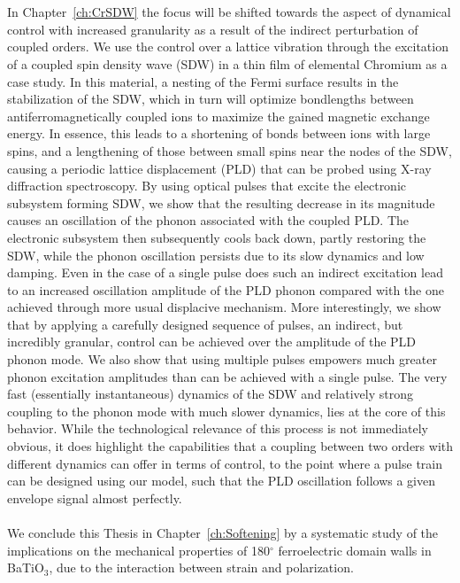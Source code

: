 \\\\
In Chapter~\ref{ch:CrSDW} the focus will be shifted towards the aspect of dynamical control with increased granularity as a result of the indirect perturbation of coupled orders.
We use the control over a lattice vibration through the excitation of a coupled spin density wave (SDW) in a thin film of elemental Chromium as a case study.
In this material, a nesting of the Fermi surface results in the stabilization of the SDW, which in turn will optimize bondlengths between antiferromagnetically coupled ions to maximize the gained magnetic exchange energy.
In essence, this leads to a shortening of bonds between ions with large spins, and a lengthening of those between small spins near the nodes of the SDW, causing a periodic lattice displacement (PLD) that can be probed using X-ray diffraction spectroscopy.
By using optical pulses that excite the electronic subsystem forming SDW, we show that the resulting  decrease in its magnitude causes an oscillation of the phonon associated with the coupled PLD.
The electronic subsystem then subsequently cools back down, partly restoring the SDW, while the phonon oscillation persists due to its slow dynamics and low damping.
Even in the case of a single pulse does such an indirect excitation lead to an increased oscillation amplitude of the PLD phonon compared with the one achieved through more usual displacive mechanism.
More interestingly, we show that by applying a carefully designed sequence of pulses, an indirect, but incredibly granular, control can be achieved over the amplitude of the PLD phonon mode.
We also show that using multiple pulses empowers much greater phonon excitation amplitudes than can be achieved with a single pulse.
The very fast (essentially instantaneous) dynamics of the SDW and relatively strong coupling to the phonon mode with much slower dynamics, lies at the core of this behavior.
While the technological relevance of this process is not immediately obvious, it does highlight the capabilities that a coupling between two orders with different dynamics can offer in terms of control, to the point where a pulse train can be designed using our model, such that the PLD oscillation follows a given envelope signal almost perfectly.
\\\\
We conclude this Thesis in Chapter~\ref{ch:Softening} by a systematic study of the implications on the mechanical properties of 180$^\circ$ ferroelectric domain walls in BaTiO$_3$, due to the interaction between strain and polarization.

